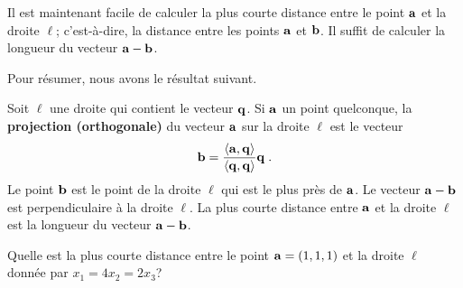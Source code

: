 {Il est maintenant facile de calculer la plus courte distance entre le
point $\mathbf{a}$ et la droite $\ell$; c'est-à-dire, la distance entre
les points $\mathbf{a}$ et $\mathbf{b}$.  Il suffit de calculer la longueur
du vecteur $\mathbf{a}-\mathbf{b}$.


Pour résumer, nous avons le résultat suivant.

\begin{defn} 
Soit $\ell$ une droite qui contient le vecteur $\mathbf{q}$.  Si
$\mathbf{a}$ un point quelconque, la {\bfseries projection (orthogonale)}
du vecteur $\mathbf{a}$ sur la droite $\ell$ est le vecteur
\[
\mathbf{b} =  \frac{\left\langle{\mathbf{a}} , {\mathbf{q}}\right\rangle}{\left\langle{\mathbf{q}} , {\mathbf{q}}\right\rangle} \mathbf{q} \; .
\]
Le point $\mathbf{b}$ est le point de la droite $\ell$ qui est le plus
près de $\mathbf{a}$.  Le vecteur $\mathbf{a}-\mathbf{b}$ est perpendiculaire à
la droite $\ell$.  La plus courte distance entre $\mathbf{a}$ et la droite
$\ell$ est la longueur du vecteur $\mathbf{a}-\mathbf{b}$.
\end{defn}

\begin{egg}
Quelle est la plus courte distance entre le point $\mathbf{a}=(1,1,1)$ et
la droite $\ell$ donnée par $x_1 = 4x_2 = 2x_3$?


\end{egg}}
